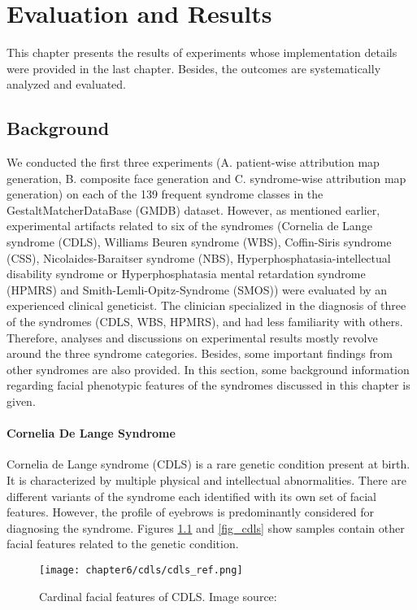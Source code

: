 \documentclass[../report.tex]{subfiles}
\begin{document}
    \chapter{Evaluation and Results}
	This chapter presents the results of experiments whose implementation details were provided in the last chapter. Besides, the outcomes are systematically analyzed and evaluated.
	
	
	\section{Background}
	We conducted the first three experiments (A. patient-wise attribution map generation, B. composite face generation and C. syndrome-wise attribution map generation) on each of the 139 frequent syndrome classes in the GestaltMatcherDataBase (GMDB) dataset. However, as mentioned earlier, experimental artifacts related to six of the syndromes (Cornelia de Lange syndrome (CDLS), Williams Beuren syndrome (WBS),  Coffin-Siris syndrome (CSS),  Nicolaides-Baraitser syndrome (NBS), Hyperphosphatasia-intellectual disability syndrome or Hyperphosphatasia mental retardation syndrome (HPMRS) and Smith-Lemli-Opitz-Syndrome (SMOS)) were evaluated by an experienced clinical geneticist. The clinician specialized in the diagnosis of three of the syndromes (CDLS, WBS, HPMRS), and had less familiarity with others. Therefore, analyses and discussions on experimental results mostly revolve around the three syndrome categories. Besides, some important findings from other syndromes are also provided. In this section, some background information regarding facial phenotypic features of the syndromes discussed in this chapter is given. 
	
	\subsubsection{Cornelia De Lange Syndrome}
	Cornelia de Lange syndrome (CDLS) is a rare genetic condition present at birth. It is characterized by multiple physical and intellectual abnormalities. There are different variants of the syndrome each identified with its own set of facial features. However, the profile of eyebrows is predominantly considered for diagnosing the syndrome. Figures \ref{fig_cdls_char} and \ref{fig_cdls} show samples contain other facial features related to the genetic condition.
		\begin{figure}[H]
		\centering
		\texttt{[image: chapter6/cdls/cdls\_ref.png]}	
		\caption[Cardinal features of CDLS]{Cardinal facial features of CDLS. Image source: \cite{kline2018diagnosis}}
		\label{fig_cdls_char}
	\end{figure}
	
\end{document}
